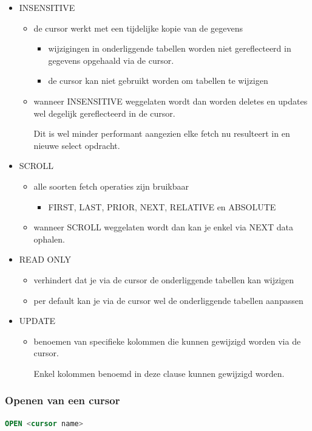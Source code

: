 \documentclass[a4paper,12pt]{article}
\begin{document}
\begin{itemize}
\item INSENSITIVE
	\begin{itemize}
	\item de cursor werkt met een tijdelijke kopie van de gegevens
		\begin{itemize}
		\item wijzigingen in onderliggende tabellen worden niet gereflecteerd in gegevens opgehaald via de cursor.
		\item de cursor kan niet gebruikt worden om tabellen te wijzigen
		\end{itemize}
	\item wanneer INSENSITIVE weggelaten wordt dan worden deletes en updates wel degelijk gereflecteerd in de cursor. 
	
	Dit is wel minder performant aangezien elke fetch nu resulteert in en nieuwe select opdracht.
	\end{itemize}
\item SCROLL
	\begin{itemize}
	\item alle soorten fetch operaties zijn bruikbaar
		\begin{itemize}
		\item FIRST, LAST, PRIOR, NEXT, RELATIVE en ABSOLUTE
		\end{itemize}
	\item wanneer SCROLL weggelaten wordt dan kan je enkel via NEXT data ophalen.
	\end{itemize}
\item READ ONLY
	\begin{itemize}
	\item verhindert dat je via de cursor de onderliggende tabellen kan wijzigen
	\item per default kan je via de cursor wel de onderliggende tabellen aanpassen
	\end{itemize}
\item UPDATE
	\begin{itemize}
	\item benoemen van specifieke kolommen die kunnen gewijzigd worden via de cursor.
	
	Enkel kolommen benoemd in deze clause kunnen gewijzigd worden.
	\end{itemize}
\end{itemize}

\subsubsection{Openen van een cursor}
\begin{lstlisting}[language=sql, breaklines=true]
OPEN <cursor name>
\end{lstlisting}
\end{document}
